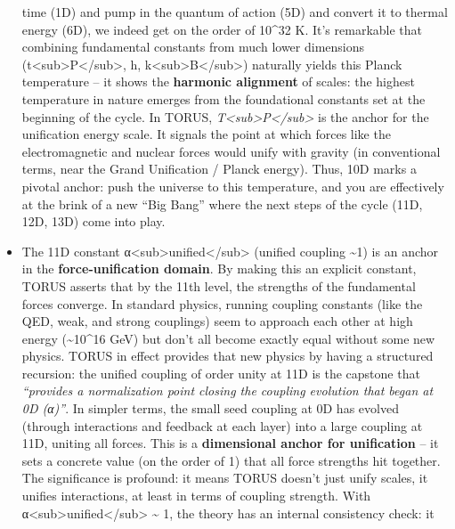 \documentclass[
]{article}
\begin{document}
\begin{itemize}
  time (1D) and pump in the quantum of action (5D) and convert it to
  thermal energy (6D), we indeed get on the order of 10\^{}32
  K\hspace{0pt}. It's remarkable that combining fundamental constants
  from much lower dimensions
  (t\textless sub\textgreater P\textless/sub\textgreater, h,
  k\textless sub\textgreater B\textless/sub\textgreater) naturally
  yields this Planck temperature -- it shows the \textbf{harmonic
  alignment} of scales: the highest temperature in nature emerges from
  the foundational constants set at the beginning of the
  cycle\hspace{0pt}. In TORUS,
  \emph{T\textless sub\textgreater P\textless/sub\textgreater{}} is the
  anchor for the unification energy scale. It signals the point at which
  forces like the electromagnetic and nuclear forces would unify with
  gravity (in conventional terms, near the Grand Unification / Planck
  energy). Thus, 10D marks a pivotal anchor: push the universe to this
  temperature, and you are effectively at the brink of a new ``Big
  Bang'' where the next steps of the cycle (11D, 12D, 13D) come into
  play.
\item
  The 11D constant
  α\textless sub\textgreater unified\textless/sub\textgreater{} (unified
  coupling \textasciitilde1) is an anchor in the
  \textbf{force-unification domain}. By making this an explicit
  constant, TORUS asserts that by the 11th level, the strengths of the
  fundamental forces converge. In standard physics, running coupling
  constants (like the QED, weak, and strong couplings) seem to approach
  each other at high energy (\textasciitilde10\^{}16 GeV) but don't all
  become exactly equal without some new physics. TORUS in effect
  provides that new physics by having a structured recursion: the
  unified coupling of order unity at 11D is the capstone that
  \emph{``provides a normalization point closing the coupling evolution
  that began at 0D (α)''}\hspace{0pt}. In simpler terms, the small seed
  coupling at 0D has evolved (through interactions and feedback at each
  layer) into a large coupling at 11D, uniting all forces. This is a
  \textbf{dimensional anchor for unification} -- it sets a concrete
  value (on the order of 1) that all force strengths hit together. The
  significance is profound: it means TORUS doesn't just unify scales, it
  unifies interactions, at least in terms of coupling strength. With
  α\textless sub\textgreater unified\textless/sub\textgreater{}
  \textasciitilde{} 1, the theory has an internal consistency check: it

\end{itemize}
\end{document}
